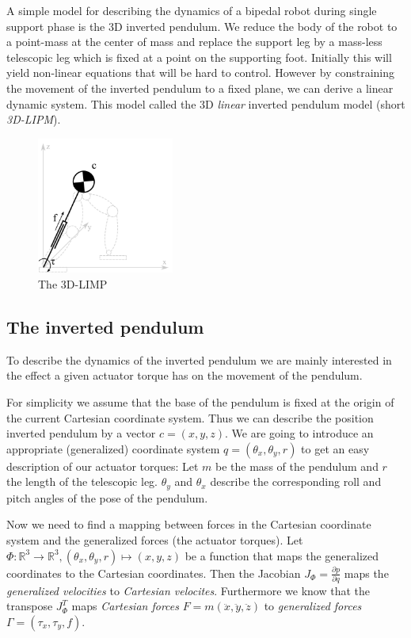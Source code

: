 \documentclass[english,ngerman]{KITreprt}
\begin{document}
A simple model for describing the dynamics of a bipedal robot during
single support phase is the 3D inverted pendulum. We reduce the body of
the robot to a point-mass at the center of mass and replace the support
leg by a mass-less telescopic leg which is fixed at a point on the
supporting foot. Initially this will yield non-linear equations that
will be hard to control. However by constraining the movement of the
inverted pendulum to a fixed plane, we can derive a linear dynamic
system. This model called the 3D \emph{linear} inverted pendulum model
(short \emph{3D-LIPM}).

\begin{figure}
  \begin{center}
     \includegraphics[width=0.4\textwidth]{images/3dlimp.png}
  \end{center}
  \caption{The 3D-LIMP}
\end{figure}

\subsection{The inverted pendulum}\label{the-inverted-pendulum}

To describe the dynamics of the inverted pendulum we are mainly
interested in the effect a given actuator torque has on the movement of
the pendulum.

For simplicity we assume that the base of the pendulum is fixed at the
origin of the current Cartesian coordinate system. Thus we can describe
the position inverted pendulum by a vector $c = (x, y, z)$. We are going
to introduce an appropriate (generalized) coordinate system
$q = (\theta_x, \theta_y, r)$ to get an easy description of our actuator
torques: Let $m$ be the mass of the pendulum and $r$ the length of the
telescopic leg. $\theta_y$ and $\theta_x$ describe the corresponding
roll and pitch angles of the pose of the pendulum.

Now we need to find a mapping between forces in the Cartesian coordinate
system and the generalized forces (the actuator torques). Let
$\Phi: \mathbb{R}^3 \longrightarrow \mathbb{R}^3, (\theta_x, \theta_y, r) \mapsto (x, y, z)$
be a function that maps the generalized coordinates to the Cartesian
coordinates. Then the Jacobian $J_\Phi = \frac{\partial p}{\partial q}$
maps the \emph{generalized velocities} to \emph{Cartesian velocites}.
Furthermore we know that the transpose $J_\Phi^T$ maps \emph{Cartesian
forces} $F = m (\ddot x, \ddot y, \ddot z)$ to \emph{generalized forces}
$\Gamma = (\tau_x, \tau_y, f)$.
\end{document}

